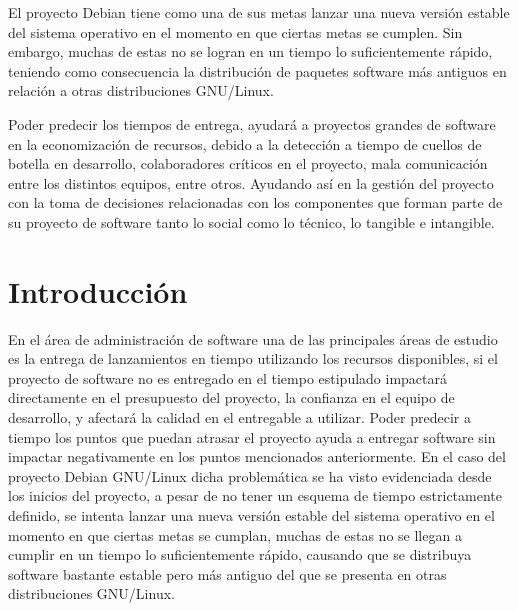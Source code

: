 \documentclass[12pt,titlepage]{report}
\begin{document}
El proyecto Debian tiene como una de sus metas
lanzar una nueva versión estable del sistema operativo en el momento
en que ciertas metas se cumplen.  Sin embargo, muchas de estas no se
logran en un tiempo lo suficientemente rápido, teniendo como
consecuencia la distribución de paquetes software más antiguos en
relación a otras distribuciones GNU/Linux.

Poder predecir los tiempos de entrega, ayudará a proyectos grandes de
software en la economización de recursos, debido a la detección a
tiempo de cuellos de botella en desarrollo, colaboradores críticos en
el proyecto, mala comunicación entre los distintos equipos, entre
otros.  Ayudando así en la gestión del proyecto con la toma de
decisiones relacionadas con los componentes que forman parte de su
proyecto de software tanto lo social como lo técnico, lo tangible e
intangible.

\chapter{Introducción} En el área de administración de software una de
las principales áreas de estudio es la entrega de lanzamientos en
tiempo utilizando los recursos disponibles, si el proyecto de software
no es entregado en el tiempo estipulado impactará directamente en el
presupuesto del proyecto, la confianza en el equipo de desarrollo, y
afectará la calidad en el entregable a utilizar. Poder predecir a
tiempo los puntos que puedan atrasar el proyecto ayuda a entregar
software sin impactar negativamente en los puntos mencionados
anteriormente.  En el caso del proyecto Debian GNU/Linux dicha
problemática se ha visto evidenciada desde los inicios del proyecto, a
pesar de no tener un esquema de tiempo estrictamente definido, se
intenta lanzar una nueva versión estable del sistema operativo en el
momento en que ciertas metas se cumplan, muchas de estas no se llegan
a cumplir en un tiempo lo suficientemente rápido, causando que se
distribuya software bastante estable pero más antiguo del que se
presenta en otras distribuciones GNU/Linux.
\end{document}
